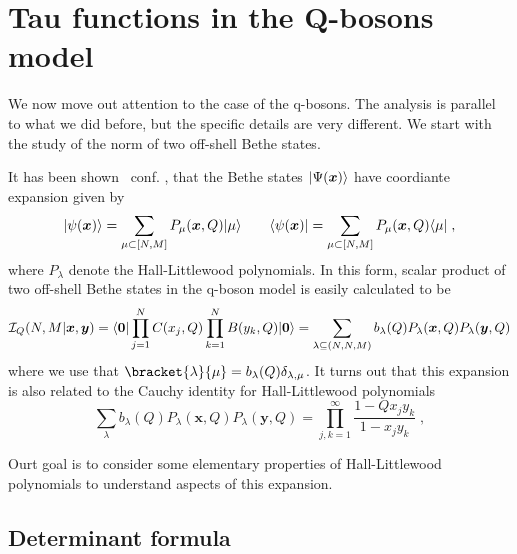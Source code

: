 \documentclass[a4paper,11pt]{amsart}
\begin{document}

\section{Tau functions in the Q-bosons model}

We now move out attention to the case of the q-bosons. The 
analysis is parallel to what we did before, but the  specific 
details are very different. We start with the study of the norm of  
two off-shell Bethe states. 

It has been shown~\cite{Tsilevich:2006} conf. \cite{Sulkowski:2008mx,
  Wheeler:2010vmq}, that the Bethe states \(\lvert\Psi(\bm{x})\rangle\) have 
coordiante expansion given by
\begin{equation}
  \lvert\psi(\bm{x})\rangle = \sum_{\mu \subset [N,M]} P_\mu(\bm{x}, Q) \lvert\mu\rangle  \qquad 
  \langle\psi(\bm{x})\rvert = \sum_{\mu \subset [N,M]} P_\mu(\bm{x}, Q) \langle\mu\rvert\; ,
\end{equation}
where \(P_\lambda\) denote the Hall-Littlewood polynomials.  In this
form, scalar product of two off-shell Bethe states in the q-boson
model is easily calculated to be
\begin{equation}
\label{eq:scalar-hl}
\mathcal{I}_Q(N,M | \bm{x}, \bm{y}) = \langle\bm{0}\rvert \prod_{j=1}^N C(x_j, Q)
\prod_{k=1}^N B(y_k, Q) \lvert\bm{0}\rangle
= \sum_{\lambda \subseteq
  (N,N,M)} b_\lambda(Q) P_{\lambda}(\bm{x}, Q) P_{\lambda}(\bm{y}, Q)
\end{equation}
where we use that \(\bracket{\lambda}{\mu} = b_\lambda(Q)
\delta_{\lambda, \mu}\).  It turns out that this expansion is also
related to the Cauchy identity for Hall-Littlewood
polynomials~\cite{Macdonald:1998}
\begin{equation}
\label{eq:cauchy_hl}
\sum_{\lambda} b_\lambda(Q) P_{\lambda}(\bm{x}, Q) P_{\lambda}(\bm{y}, Q)
= \prod_{j, k=1}^\infty \frac{1-Q x_j y_k}{1 - x_j y_k}\; ,
\end{equation}

Ourt goal is to consider some elementary properties of Hall-Littlewood polynomials 
to understand aspects of this expansion. 


\subsection{Determinant formula}
\end{document}
